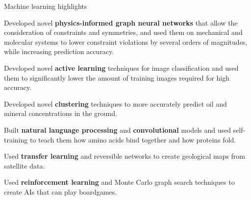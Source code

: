 


\begin{cventries}


  \cventry
    {Machine learning highlights} %
    {} %
    {} %
    {} %
    {
      \begin{cvitems} %
        \item {Developed novel \textbf{physics-informed graph neural networks} that allow the consideration of constraints and symmetries, and used them on mechanical and molecular systems to lower constraint violations by several orders of magnitudes, while increasing prediction accuracy.}
        \item {Developed novel \textbf{active learning} techniques for image classification and used them to significantly lower the amount of training images required for high accuracy.}
        \item {Developed novel \textbf{clustering} techniques to more accurately predict oil and mineral concentrations in the ground.}
        \item {Built \textbf{natural language processing} and \textbf{convolutional} models and used self-training to teach them how amino acids bind together and how proteins fold.}
        \item {Used \textbf{transfer learning} and reversible networks to create geological maps from satellite data.}
        \item {Used \textbf{reinforcement learning} and Monte Carlo graph search techniques to create AIs that can play boardgames.}
      \end{cvitems}
    }


\end{cventries}
